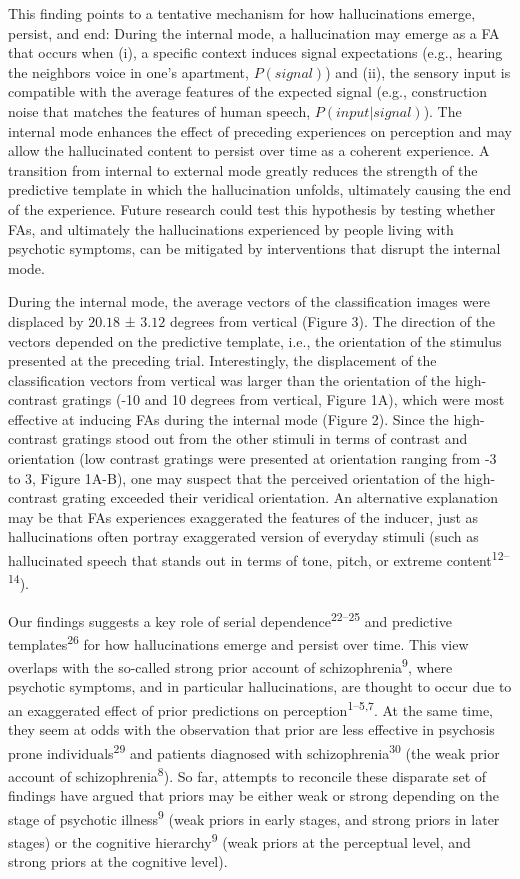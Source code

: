 \documentclass[
]{article}
\begin{document}
This finding points to a tentative mechanism for how hallucinations
emerge, persist, and end: During the internal mode, a hallucination may
emerge as a FA that occurs when (i), a specific context induces signal
expectations (e.g., hearing the neighbors voice in one's apartment,
\(P(signal)\)) and (ii), the sensory input is compatible with the
average features of the expected signal (e.g., construction noise that
matches the features of human speech, \(P(input|signal)\)). The internal
mode enhances the effect of preceding experiences on perception and may
allow the hallucinated content to persist over time as a coherent
experience. A transition from internal to external mode greatly reduces
the strength of the predictive template in which the hallucination
unfolds, ultimately causing the end of the experience. Future research
could test this hypothesis by testing whether FAs, and ultimately the
hallucinations experienced by people living with psychotic symptoms, can
be mitigated by interventions that disrupt the internal mode.

During the internal mode, the average vectors of the classification
images were displaced by \(20.18\) ± \(3.12\) degrees from vertical
(Figure 3). The direction of the vectors depended on the predictive
template, i.e., the orientation of the stimulus presented at the
preceding trial. Interestingly, the displacement of the classification
vectors from vertical was larger than the orientation of the
high-contrast gratings (-10 and 10 degrees from vertical, Figure 1A),
which were most effective at inducing FAs during the internal mode
(Figure 2). Since the high-contrast gratings stood out from the other
stimuli in terms of contrast and orientation (low contrast gratings were
presented at orientation ranging from -3 to 3, Figure 1A-B), one may
suspect that the perceived orientation of the high-contrast grating
exceeded their veridical orientation. An alternative explanation may be
that FAs experiences exaggerated the features of the inducer, just as
hallucinations often portray exaggerated version of everyday stimuli
(such as hallucinated speech that stands out in terms of tone, pitch, or
extreme content\textsuperscript{12--14}).

Our findings suggests a key role of serial
dependence\textsuperscript{22--25} and predictive
templates\textsuperscript{26} for how hallucinations emerge and persist
over time. This view overlaps with the so-called strong prior account of
schizophrenia\textsuperscript{9}, where psychotic symptoms, and in
particular hallucinations, are thought to occur due to an exaggerated
effect of prior predictions on perception\textsuperscript{1--5,7}. At
the same time, they seem at odds with the observation that prior are
less effective in psychosis prone individuals\textsuperscript{29} and
patients diagnosed with schizophrenia\textsuperscript{30} (the weak
prior account of schizophrenia\textsuperscript{8}). So far, attempts to
reconcile these disparate set of findings have argued that priors may be
either weak or strong depending on the stage of psychotic
illness\textsuperscript{9} (weak priors in early stages, and strong
priors in later stages) or the cognitive hierarchy\textsuperscript{9}
(weak priors at the perceptual level, and strong priors at the cognitive
level).
\end{document}
